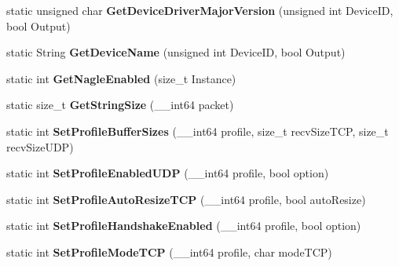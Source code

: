 \begin{DoxyCompactItemize}
\item 
\hypertarget{structmn_c_l_r_a3be6b415ce945ec93b16915a1b8e2f83}{
static unsigned char {\bfseries GetDeviceDriverMajorVersion} (unsigned int DeviceID, bool Output)}
\label{structmn_c_l_r_a3be6b415ce945ec93b16915a1b8e2f83}

\item 
\hypertarget{structmn_c_l_r_a08bd2ca094ba163554c2037d7f1549c0}{
static String {\bfseries GetDeviceName} (unsigned int DeviceID, bool Output)}
\label{structmn_c_l_r_a08bd2ca094ba163554c2037d7f1549c0}

\item 
\hypertarget{structmn_c_l_r_a18c72c2562abd1d47c74780c74a22bb5}{
static int {\bfseries GetNagleEnabled} (size\_\-t Instance)}
\label{structmn_c_l_r_a18c72c2562abd1d47c74780c74a22bb5}

\item 
\hypertarget{structmn_c_l_r_a8fe31e8393b02409e1b44fc3afa26ea3}{
static size\_\-t {\bfseries GetStringSize} (\_\-\_\-int64 packet)}
\label{structmn_c_l_r_a8fe31e8393b02409e1b44fc3afa26ea3}

\item 
\hypertarget{structmn_c_l_r_a522d54449de98715881b120f0110cd64}{
static int {\bfseries SetProfileBufferSizes} (\_\-\_\-int64 profile, size\_\-t recvSizeTCP, size\_\-t recvSizeUDP)}
\label{structmn_c_l_r_a522d54449de98715881b120f0110cd64}

\item 
\hypertarget{structmn_c_l_r_a44a0d93f7503c88d844e26e259b4c7b4}{
static int {\bfseries SetProfileEnabledUDP} (\_\-\_\-int64 profile, bool option)}
\label{structmn_c_l_r_a44a0d93f7503c88d844e26e259b4c7b4}

\item 
\hypertarget{structmn_c_l_r_a99f91a0dc3be9577d88a4d7d16e806c6}{
static int {\bfseries SetProfileAutoResizeTCP} (\_\-\_\-int64 profile, bool autoResize)}
\label{structmn_c_l_r_a99f91a0dc3be9577d88a4d7d16e806c6}

\item 
\hypertarget{structmn_c_l_r_afa7402190eaae9484b26025109286143}{
static int {\bfseries SetProfileHandshakeEnabled} (\_\-\_\-int64 profile, bool option)}
\label{structmn_c_l_r_afa7402190eaae9484b26025109286143}

\item 
\hypertarget{structmn_c_l_r_ad9cb5a0c0e1e066a8b90572e7b37255b}{
static int {\bfseries SetProfileModeTCP} (\_\-\_\-int64 profile, char modeTCP)}
\label{structmn_c_l_r_ad9cb5a0c0e1e066a8b90572e7b37255b}


\end{DoxyCompactItemize}
